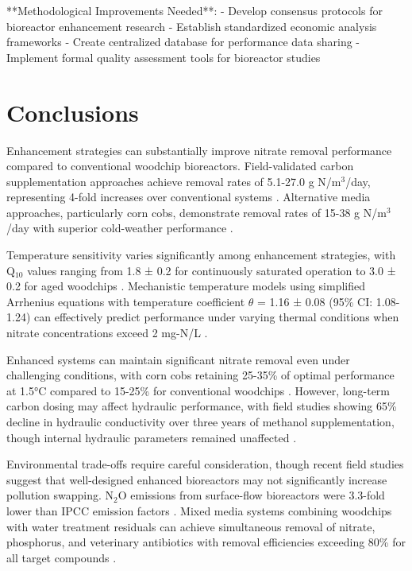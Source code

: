 \documentclass[12pt,a4paper]{article}
\begin{document}
**Methodological Improvements Needed**:
- Develop consensus protocols for bioreactor enhancement research
- Establish standardized economic analysis frameworks
- Create centralized database for performance data sharing
- Implement formal quality assessment tools for bioreactor studies

\section{Conclusions}

Enhancement strategies can substantially improve nitrate removal performance compared to conventional woodchip bioreactors. Field-validated carbon supplementation approaches achieve removal rates of 5.1-27.0 g N/m$^3$/day, representing 4-fold increases over conventional systems \citep{RN242}. Alternative media approaches, particularly corn cobs, demonstrate removal rates of 15-38 g N/m$^3$/day with superior cold-weather performance \citep{new_ref_2}.

Temperature sensitivity varies significantly among enhancement strategies, with Q$_{10}$ values ranging from 1.8 ± 0.2 for continuously saturated operation to 3.0 ± 0.2 for aged woodchips \citep{RN228}. Mechanistic temperature models using simplified Arrhenius equations with temperature coefficient $\theta$ = 1.16 ± 0.08 (95\% CI: 1.08-1.24) can effectively predict performance under varying thermal conditions when nitrate concentrations exceed 2 mg-N/L \citep{RN242}.

Enhanced systems can maintain significant nitrate removal even under challenging conditions, with corn cobs retaining 25-35\% of optimal performance at 1.5°C compared to 15-25\% for conventional woodchips \citep{new_ref_2}. However, long-term carbon dosing may affect hydraulic performance, with field studies showing 65\% decline in hydraulic conductivity over three years of methanol supplementation, though internal hydraulic parameters remained unaffected \citep{RN242}.

Environmental trade-offs require careful consideration, though recent field studies suggest that well-designed enhanced bioreactors may not significantly increase pollution swapping. N$_{2}$O emissions from surface-flow bioreactors were 3.3-fold lower than IPCC emission factors \citep{RN1181}. Mixed media systems combining woodchips with water treatment residuals can achieve simultaneous removal of nitrate, phosphorus, and veterinary antibiotics with removal efficiencies exceeding 80\% for all target compounds \citep{RN625}.
\end{document}
